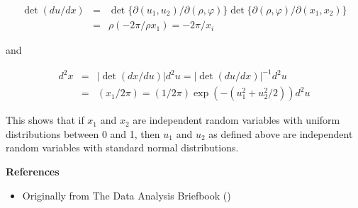 \documentclass[12pt]{article}
\begin{document}
\begin{eqnarray*}
\det (du/dx) & = & \det \{ \partial(u_1,u_2)/\partial(\rho,\varphi)\} \det\{\partial(\rho,\varphi) / \partial(x_1,x_2)\} \\
 & = & \rho(-2 \pi /\rho x_1) = -2 \pi / x_i
\end{eqnarray*}

and

\begin{eqnarray*}
 d^2 x & = & | \det(dx/du) | d^2u = |\det(du/dx)|^{-1} d^2 u \\
  & = & (x_1/2\pi) = (1/2 \pi) \exp(-(u_1^2+u_2^2/2))d^2 u
\end{eqnarray*}

This shows that if $x_1$ and $x_2$ are independent random variables with uniform distributions between 0 and 1, then $u_1$ and $u_2$ as defined above are independent random variables with standard normal distributions. 

{\bf References}

\begin{itemize}
\item Originally from The Data Analysis Briefbook
()
\end{itemize}
\end{document}
